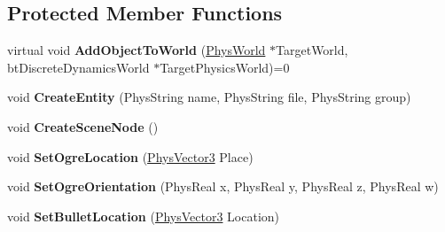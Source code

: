 \subsection*{Protected Member Functions}
\begin{DoxyCompactItemize}
\item 
\hypertarget{classActorBase_afa6cc1d348a62856ac4550aa3d4b5605}{
virtual void {\bfseries AddObjectToWorld} (\hyperlink{classPhysWorld}{PhysWorld} $\ast$TargetWorld, btDiscreteDynamicsWorld $\ast$TargetPhysicsWorld)=0}
\label{dd/d7b/classActorBase_afa6cc1d348a62856ac4550aa3d4b5605}

\item 
\hypertarget{classActorBase_aa87583c47b8653e8ac7d96f1481b57fd}{
void {\bfseries CreateEntity} (PhysString name, PhysString file, PhysString group)}
\label{dd/d7b/classActorBase_aa87583c47b8653e8ac7d96f1481b57fd}

\item 
\hypertarget{classActorBase_a168cd57e20b2adfc5cae21627ddbae31}{
void {\bfseries CreateSceneNode} ()}
\label{dd/d7b/classActorBase_a168cd57e20b2adfc5cae21627ddbae31}

\item 
\hypertarget{classActorBase_a3140cc5c1c630efc1c04c20ada319b8b}{
void {\bfseries SetOgreLocation} (\hyperlink{classPhysVector3}{PhysVector3} Place)}
\label{dd/d7b/classActorBase_a3140cc5c1c630efc1c04c20ada319b8b}

\item 
\hypertarget{classActorBase_a64ec1d0987bb32070e0c686db3b06e56}{
void {\bfseries SetOgreOrientation} (PhysReal x, PhysReal y, PhysReal z, PhysReal w)}
\label{dd/d7b/classActorBase_a64ec1d0987bb32070e0c686db3b06e56}

\item 
\hypertarget{classActorBase_af64a57138bbd32c52581a5c8d0d29a76}{
void {\bfseries SetBulletLocation} (\hyperlink{classPhysVector3}{PhysVector3} Location)}
\label{dd/d7b/classActorBase_af64a57138bbd32c52581a5c8d0d29a76}

\end{DoxyCompactItemize}
